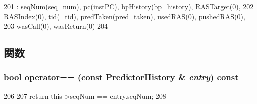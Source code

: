\begin{DoxyCode}
201             : seqNum(seq_num), pc(instPC), bpHistory(bp_history), RASTarget(0),
202               RASIndex(0), tid(_tid), predTaken(pred_taken), usedRAS(0), 
      pushedRAS(0),
203               wasCall(0), wasReturn(0)
204         {}
\end{DoxyCode}


\subsection{関数}
\hypertarget{structBPredUnit_1_1PredictorHistory_a9622b62f27c09806163e67f27c8c0835}{
\subsubsection[{operator==}]{\setlength{\rightskip}{0pt plus 5cm}bool operator== (const {\bf PredictorHistory} \& {\em entry}) const}}
\label{structBPredUnit_1_1PredictorHistory_a9622b62f27c09806163e67f27c8c0835}



\begin{DoxyCode}
206                                                              {
207             return this->seqNum == entry.seqNum;
208         }
\end{DoxyCode}


